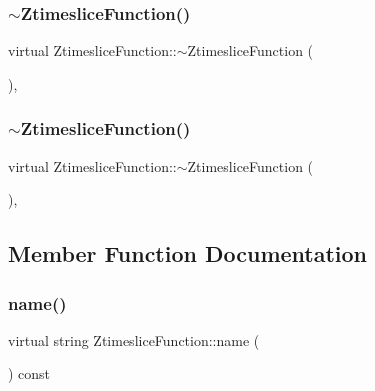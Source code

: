 \subsubsection{\texorpdfstring{$\sim$ZtimesliceFunction()}{~ZtimesliceFunction()}\hspace{0.1cm}{\footnotesize\ttfamily [1/2]}}
{\footnotesize\ttfamily virtual Ztimeslice\+Function\+::$\sim$\+Ztimeslice\+Function (\begin{DoxyParamCaption}{ }\end{DoxyParamCaption})\hspace{0.3cm}{\ttfamily [inline]}, {\ttfamily [virtual]}}

\mbox{\label{classZtimesliceFunction_a7ca31c90f0865bd64d13476aac4cf67c}} 
\subsubsection{\texorpdfstring{$\sim$ZtimesliceFunction()}{~ZtimesliceFunction()}\hspace{0.1cm}{\footnotesize\ttfamily [2/2]}}
{\footnotesize\ttfamily virtual Ztimeslice\+Function\+::$\sim$\+Ztimeslice\+Function (\begin{DoxyParamCaption}{ }\end{DoxyParamCaption})\hspace{0.3cm}{\ttfamily [inline]}, {\ttfamily [virtual]}}



\subsection{Member Function Documentation}
\mbox{\label{classZtimesliceFunction_a3c98a40a6155270bbb11d74c1b0f838c}} 
\subsubsection{\texorpdfstring{name()}{name()}\hspace{0.1cm}{\footnotesize\ttfamily [1/2]}}
{\footnotesize\ttfamily virtual string Ztimeslice\+Function\+::name (\begin{DoxyParamCaption}{ }\end{DoxyParamCaption}) const\hspace{0.3cm}{\ttfamily [pure virtual]}}



